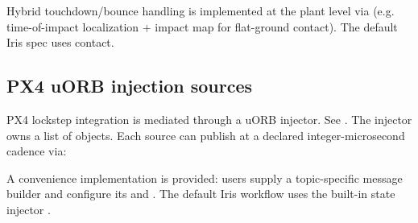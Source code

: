 Hybrid touchdown/bounce handling is implemented at the plant level via  (e.g. time-of-impact localization + impact map for flat-ground contact). The default Iris spec uses  contact.

\subsection{PX4 uORB injection sources}


PX4 lockstep integration is mediated through a uORB injector. See . The injector owns a list of  objects. Each source can publish at a declared integer-microsecond cadence via:
\begin{quote}\small
{}
\end{quote}
A convenience implementation  is provided: users supply a topic-specific message builder  and configure its  and . The default Iris workflow uses the built-in state injector .
